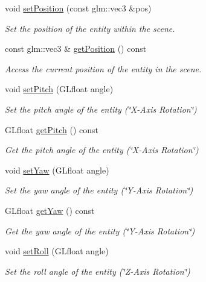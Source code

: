 \begin{DoxyCompactItemize}
void \hyperlink{class_scene_object_af36a3463b19299b7d7cca2b476c36870}{set\+Position} (const glm\+::vec3 \&pos)
\begin{DoxyCompactList}\small\item\em Set the position of the entity within the scene. \end{DoxyCompactList}\item 
const glm\+::vec3 \& \hyperlink{class_scene_object_a91736aa3f5e06edb68c7c19ce9fbee85}{get\+Position} () const 
\begin{DoxyCompactList}\small\item\em Access the current position of the entity in the scene. \end{DoxyCompactList}\item 
void \hyperlink{class_scene_object_a07c1e8cb533c089560eb4d2cb319c629}{set\+Pitch} (G\+Lfloat angle)
\begin{DoxyCompactList}\small\item\em Set the pitch angle of the entity (\char`\"{}\+X-\/\+Axis Rotation\char`\"{}) \end{DoxyCompactList}\item 
G\+Lfloat \hyperlink{class_scene_object_a1a9a56ef5f3599892b14909dba70baa2}{get\+Pitch} () const 
\begin{DoxyCompactList}\small\item\em Get the pitch angle of the entity (\char`\"{}\+X-\/\+Axis Rotation\char`\"{}) \end{DoxyCompactList}\item 
void \hyperlink{class_scene_object_a92e89c65e5d427333919e7b6e5d1ce8c}{set\+Yaw} (G\+Lfloat angle)
\begin{DoxyCompactList}\small\item\em Set the yaw angle of the entity (\char`\"{}\+Y-\/\+Axis Rotation\char`\"{}) \end{DoxyCompactList}\item 
G\+Lfloat \hyperlink{class_scene_object_a61c445c541ab50f0f4e859d43926d71e}{get\+Yaw} () const 
\begin{DoxyCompactList}\small\item\em Get the yaw angle of the entity (\char`\"{}\+Y-\/\+Axis Rotation\char`\"{}) \end{DoxyCompactList}\item 
void \hyperlink{class_scene_object_aceabc31f66aa4929b7d7901da5660b1d}{set\+Roll} (G\+Lfloat angle)
\begin{DoxyCompactList}\small\item\em Set the roll angle of the entity (\char`\"{}\+Z-\/\+Axis Rotation\char`\"{}) \end{DoxyCompactList}\item 

\end{DoxyCompactItemize}
